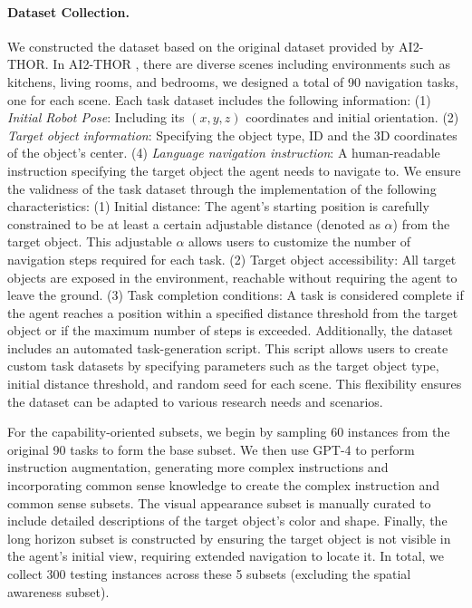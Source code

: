 \paragraph{Dataset Collection.}
We constructed the dataset based on the original dataset provided by AI2-THOR. In AI2-THOR \cite{kolve2017ai2}, there are diverse scenes including environments such as kitchens, living rooms, and bedrooms, we designed a total of 90 navigation tasks, one for each scene. Each task dataset includes the following information:  
(1) \textit{Initial Robot Pose}: Including its $(x, y, z)$ coordinates and initial orientation.  
(2) \textit{Target object information}: Specifying the object type, ID and the 3D coordinates of the object’s center.  
(4) \textit{Language navigation instruction}: A human-readable instruction specifying the target object the agent needs to navigate to.
We ensure the validness of the task dataset through the implementation of the following characteristics:  
(1) Initial distance: The agent’s starting position is carefully constrained to be at least a certain adjustable distance (denoted as $\alpha$) from the target object. This adjustable $\alpha$ allows users to customize the number of navigation steps required for each task.  
(2) Target object accessibility: All target objects are exposed in the environment, reachable without requiring the agent to leave the ground.  
(3) Task completion conditions: A task is considered complete if the agent reaches a position within a specified distance threshold from the target object or if the maximum number of steps is exceeded.
Additionally, the dataset includes an automated task-generation script. This script allows users to create custom task datasets by specifying parameters such as the target object type, initial distance threshold, and random seed for each scene. This flexibility ensures the dataset can be adapted to various research needs and scenarios.

For the capability-oriented subsets, we begin by sampling 60 instances from the original 90 tasks to form the base subset. We then use GPT-4 to perform instruction augmentation, generating more complex instructions and incorporating common sense knowledge to create the complex instruction and common sense subsets. The visual appearance subset is manually curated to include detailed descriptions of the target object's color and shape. Finally, the long horizon subset is constructed by ensuring the target object is not visible in the agent's initial view, requiring extended navigation to locate it. In total, we collect 300 testing instances across these 5 subsets (excluding the spatial awareness subset).



